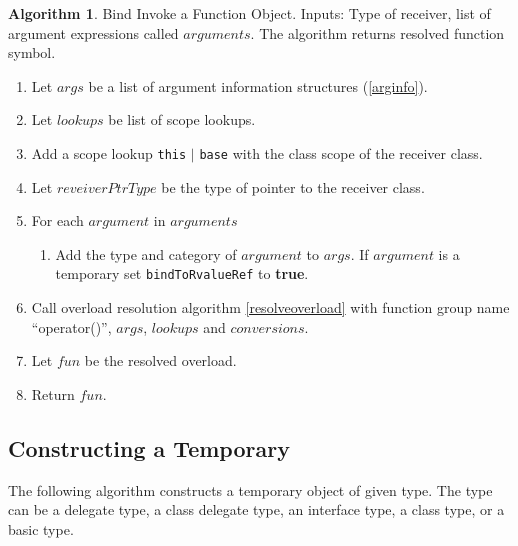 \documentclass[a4paper,oneside,11pt]{book}
\theoremstyle{definition}
\newtheorem{algo}{Algorithm}[section]
\begin{document}
\begin{algo}\label{bindinvokeopapply} Bind Invoke a Function Object.
Inputs: Type of receiver, list of argument expressions called $arguments$.
The algorithm returns resolved function symbol.
\begin{enumerate}
\item
Let $args$ be a list of argument information structures (\ref{arginfo}).
\item
Let $lookups$ be list of scope lookups.
\item
Add a scope lookup \verb|this| $|$ \verb|base| with the class scope of the receiver class.
\item
Let $reveiverPtrType$ be the type of pointer to the receiver class.
\item
For each $argument$ in $arguments$
\begin{enumerate}
\item
Add the type and category of $argument$ to $args$. If $argument$ is a temporary set \verb|bindToRvalueRef| to \textbf{true}.
\end{enumerate}
\item
Call overload resolution algorithm \ref{resolveoverload} with function group name ``operator()'', $args$, $lookups$ and $conversions$.
\item
Let $fun$ be the resolved overload.
\item
Return $fun$.
\end{enumerate}
\end{algo}

\subsection{Constructing a Temporary}

The following algorithm constructs a temporary object of given type.
The type can be a delegate type, a class delegate type, an interface type, a class type, or a basic type.
\end{document}

